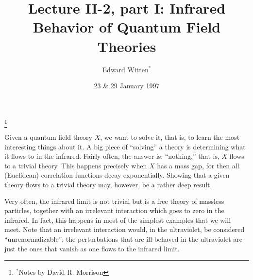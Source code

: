 \newcommand{\cb}{{\Scr S}}

\newcommand{\ee}{\text{e}}
\newcommand{\gee}{\text{g}}

\newcommand{\cA}{{\cal A}}

\newcommand{\cD}{{\cal D}}

\newcommand{\cH}{{\cal H}}

\newcommand{\cO}{{\cal O}}

\newcommand{\IR}{{\Bbb R}}
\newcommand{\IZ}{{\Bbb Z}}

\newcommand{\Hol}{\operatorname{\rm Hol}}
\newcommand{\Maps}{\operatorname{\rm Maps}}
\renewcommand{\Re}{\operatorname{\rm Re}}
\newcommand{\Tr}{\operatorname{\rm Tr}}
\newcommand{\vol}{\operatorname{\rm vol}}


\addtolength{\marginparwidth}{-.4in}
\newcommand{\note}[1]{\marginpar{\scriptsize #1 }} 



\title[]{Lecture II-2, part I: Infrared Behavior of Quantum Field Theories}
\author[]{Edward Witten$^*$}
\thanks{$^*$Notes by David R. Morrison}
\date{23 \& 29 January 1997}
\maketitle


Given a quantum field theory $X$, we want to solve it, that is, to learn the 
most interesting
things about it.  A big piece of ``solving'' a theory
is determining what it flows to
in the infrared.  Fairly often, the answer is: ``nothing,'' that is, $X$
flows to a trivial theory.  This happens precisely when $X$ has a mass gap,
for then all (Euclidean) correlation functions decay exponentially.
Showing that a given theory flows to a trivial theory may, however,
be a rather deep result.

Very often, the infrared limit is not trivial but is 
a free theory of massless particles, together
with an irrelevant interaction which goes to zero in the infrared.  
In fact, this happens in most of the simplest examples that we will meet.
Note that an irrelevant interaction would, in the ultraviolet, be considered
``unrenormalizable''; the perturbations that are ill-behaved in the
ultraviolet are just the ones that vanish as one flows to the infrared limit.


